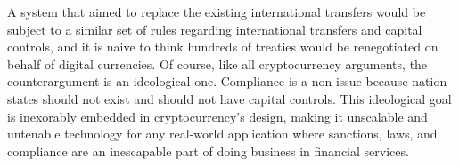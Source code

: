 A system that aimed to replace the existing international transfers would be
subject to a similar set of rules regarding international transfers and capital
controls, and it is naive to think hundreds of treaties would be renegotiated on
behalf of digital currencies. Of course, like all cryptocurrency arguments, the
counterargument is an ideological one. Compliance is a non-issue because
nation-states should not exist and should not have capital controls. This
ideological goal is inexorably embedded in cryptocurrency's design, making it
unscalable and untenable technology for any real-world application where
sanctions, laws, and compliance are an inescapable part of doing business in
financial services. \cite{hanley_false_2018}

